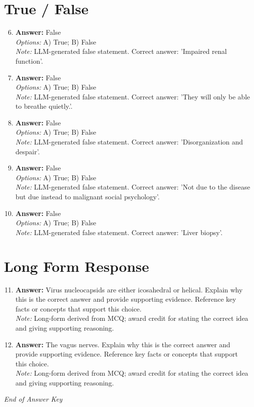 \documentclass[12pt]{article}
\begin{document}
\section*{True / False}
\begin{enumerate}[label=\arabic*.]
\setcounter{enumi}{5}
\item \textbf{Answer:} False
\\ \textit{Options:} A) True; B) False
\\ \textit{Note:} LLM-generated false statement. Correct answer: 'Impaired renal function'.
\item \textbf{Answer:} False
\\ \textit{Options:} A) True; B) False
\\ \textit{Note:} LLM-generated false statement. Correct answer: 'They will only be able to breathe quietly.'.
\item \textbf{Answer:} False
\\ \textit{Options:} A) True; B) False
\\ \textit{Note:} LLM-generated false statement. Correct answer: 'Disorganization and despair'.
\item \textbf{Answer:} False
\\ \textit{Options:} A) True; B) False
\\ \textit{Note:} LLM-generated false statement. Correct answer: 'Not due to the disease but due instead to malignant social psychology'.
\item \textbf{Answer:} False
\\ \textit{Options:} A) True; B) False
\\ \textit{Note:} LLM-generated false statement. Correct answer: 'Liver biopsy'.
\end{enumerate}

\section*{Long Form Response}
\begin{enumerate}[label=\arabic*.]
\setcounter{enumi}{10}
\item \textbf{Answer:} Virus nucleocapsids are either icosahedral or helical. Explain why this is the correct answer and provide supporting evidence. Reference key facts or concepts that support this choice.
\\ \textit{Note:} Long-form derived from MCQ; award credit for stating the correct idea and giving supporting reasoning.
\item \textbf{Answer:} The vagus nerves. Explain why this is the correct answer and provide supporting evidence. Reference key facts or concepts that support this choice.
\\ \textit{Note:} Long-form derived from MCQ; award credit for stating the correct idea and giving supporting reasoning.
\end{enumerate}

\vfill
\noindent\textit{End of Answer Key}
\end{document}
